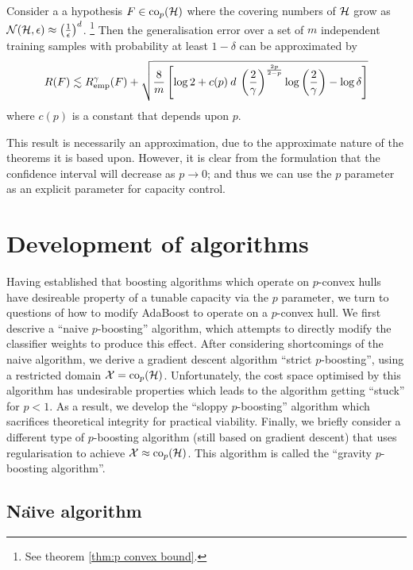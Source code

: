 \begin{theorem}
Consider a a hypothesis $F \in \mathrm{co}_p(\mathcal{H})$ where the covering
numbers of $\mathcal{H}$ grow as $\mathcal{N}({\mathcal{H}}, {\epsilon}) \approx \left
( \frac{1}{\epsilon} \right) ^d$.%
\footnote{See theorem \ref{thm:p convex bound}.}
Then the generalisation error over a set of $m$ independent training
samples with probability at least $1 - \delta$ can be approximated by 
%
\begin{equation}
R(F) \lesssim R_{\mathrm{emp}}^{\gamma}(F) + \sqrt{ \frac{8}{m} \left[ \log 2
+ c(p) \: d \: \left( \frac{2}{\gamma} \right)^{\frac{2p}{2-p}} \log
\left( \frac{2}{\gamma} \right) - \log \delta \right]}
\end{equation}
where $c(p)$ is a constant that depends upon $p$. 
%
\end{theorem}

This result is necessarily an approximation, due to the approximate
nature of the theorems it is based upon.  However, it is clear from
the formulation that the confidence interval will decrease as $p
\rightarrow 0$; and thus we can use the $p$ parameter as an explicit
parameter for capacity control.


\section{Development of algorithms}

Having established that boosting algorithms which operate on
$p$-convex hulls have desireable property of a tunable capacity via
the $p$ parameter, we turn to
questions of how to modify AdaBoost to operate on a $p$-convex hull.
We first descrive a ``naive $p$-boosting'' algorithm, which attempts
to directly modify the classifier weights to produce this effect.
After considering shortcomings of the naive algorithm, we derive a	
gradient descent algorithm ``strict $p$-boosting'', using a restricted
domain $\mathcal{X} = \mathrm{co}_p (\mathcal{H})$.  Unfortunately, the cost space
optimised by this algorithm has undesirable properties which leads to
the algorithm getting ``stuck'' for $p < 1$.  As a result, we develop
the ``sloppy $p$-boosting'' algorithm which sacrifices theoretical
integrity for practical viability.  Finally, we briefly consider a
different type of $p$-boosting algorithm (still based on gradient
descent) that uses regularisation to achieve $\mathcal{X} \approx
\mathrm{co}_p(\mathcal{H})$.  This algorithm is called the ``gravity $p$-boosting
algorithm''.


\subsection{Na\"{\i}ve algorithm}

